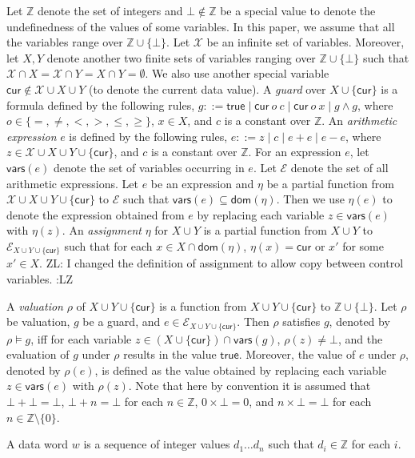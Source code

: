 \documentclass[runningheads,a4paper]{llncs}
\def\Ee{{\mathcal{E} }}
\newcommand\intnum{{\mathbb{Z} }}
\newcommand\cur{\mathsf{cur}}
\newcommand\vars{\mathsf{vars}}
\newcommand\intvars{\mathcal{X}}
\newcommand\dom{\mathsf{dom}}
\newcommand\ltrue{\mathsf{true}}
\newcommand{\zhilin}[1]{\color{cyan} {ZL: #1 :LZ} \color{black}}
\begin{document}
Let $\intnum$ denote the set of integers and $\bot \not \in \intnum$ be a special value to denote the undefinedness of the values of some variables. In this paper, we assume that all the variables range over $\intnum \cup \{\bot\}$. Let $\intvars$ be an infinite set of variables. Moreover, let $X,Y$ denote another two finite sets of variables ranging over $\intnum \cup \{\bot\}$ such that $\intvars \cap X =\intvars \cap Y = X \cap Y = \emptyset$. We also use another special variable $\cur \not \in \intvars \cup X \cup Y$ (to denote the current data value). A \emph{guard} over $X \cup \{\cur\}$ is a formula defined by the following rules, $g::= \ltrue \mid \cur\ o\ c \mid \cur\ o\ x \mid g \wedge g$, where $o \in \{=,\neq,<, >, \le, \ge\}$, $x \in X$, and $c$ is a constant over $\intnum$. An \emph{arithmetic expression} $e$ is defined by the following rules, $e::=  z \mid c \mid e + e \mid e - e$, where $z \in \intvars \cup X \cup Y \cup \{\cur\}$, and $c$ is a constant over $\intnum$. For an expression $e$, let $\vars(e)$ denote the set of variables occurring in $e$. Let $\Ee$ denote the set of all arithmetic expressions. Let $e$ be an expression and $\eta$ be a partial function from $\intvars \cup X \cup Y \cup \{\cur\}$ to $\Ee$ such that $\vars(e) \subseteq \dom(\eta)$. Then we use $\eta(e)$ to denote the expression obtained from $e$ by replacing each variable $z \in \vars(e)$ with $\eta(z)$. An \emph{assignment} $\eta$ for $X \cup Y$ is a partial function from $X \cup Y$ to $\Ee_{X \cup Y \cup \{\cur\}}$ such that for each $x \in X \cap \dom(\eta)$, $\eta(x) = \cur$ or $x'$ for some $x' \in X$. \zhilin{I changed the definition of assignment to allow copy between control variables.}

A \emph{valuation} $\rho$ of $X \cup Y \cup \{\cur\}$ is a function from $X \cup Y \cup \{\cur\}$ to $\intnum \cup \{\bot\}$. Let $\rho$ be valuation, $g$ be a guard, and $e \in \Ee_{X \cup Y \cup \{\cur\}}$. Then $\rho$ satisfies $g$, denoted by $\rho \models g$, iff for each variable $z \in (X \cup \{\cur\}) \cap \vars(g)$, $\rho(z) \neq \bot$, and the evaluation of $g$ under $\rho$ results in the value $\ltrue$. Moreover, the value of $e$ under $\rho$, denoted by $\rho(e)$, is defined as the value obtained by replacing each variable $z \in \vars(e)$ with $\rho(z)$. Note that here by convention it is assumed that $\bot + \bot = \bot$, $\bot + n = \bot$ for each $n \in \intnum$, $0 \times \bot = 0$, and $n \times \bot = \bot$ for each $n \in \intnum \setminus \{0\}$.

A data word $w$ is a sequence of integer values $d_1\dots d_n$ such that $d_i \in \intnum$ for each $i$.
\end{document}
